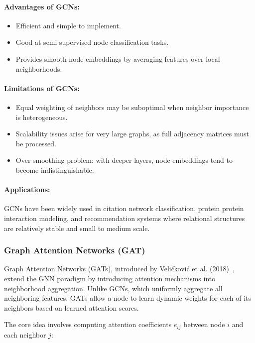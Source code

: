 \documentclass{article}
\begin{document}
\paragraph{Advantages of GCNs:}
\begin{itemize}
    \item Efficient and simple to implement.
    \item Good at semi supervised node classification tasks.
    \item Provides smooth node embeddings by averaging features over local neighborhoods.
\end{itemize}

\paragraph{Limitations of GCNs:}
\begin{itemize}
    \item Equal weighting of neighbors may be suboptimal when neighbor importance is heterogeneous.
    \item Scalability issues arise for very large graphs, as full adjacency matrices must be processed.
    \item Over smoothing problem: with deeper layers, node embeddings tend to become indistinguishable.
\end{itemize}

\paragraph{Applications:}
GCNs have been widely used in citation network classification, protein protein interaction modeling, and recommendation systems where relational structures are relatively stable and small  to medium scale.

\subsubsection{Graph Attention Networks (GAT)}

Graph Attention Networks (GATs), introduced by Veličković et al. (2018)~\cite{velikovi_2018_graph}, extend the GNN paradigm by introducing attention mechanisms into neighborhood aggregation. Unlike GCNs, which uniformly aggregate all neighboring features, GATs allow a node to learn dynamic weights for each of its neighbors based on learned attention scores\cite{velikovi_2018_graph}.

The core idea involves computing attention coefficients \(e_{ij}\) between node \(i\) and each neighbor \(j\):
\end{document}
